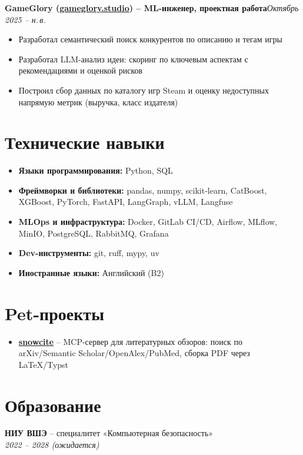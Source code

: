 \documentclass[a4paper,11pt]{article}
\begin{document}
\textbf{GameGlory (\href{https://gameglory.studio/}{gameglory.studio}) -- ML-инженер, проектная работа}\hfill \textit{Октябрь 2025 -- н.\,в.}

\begin{itemize}
  \item Разработал семантический поиск конкурентов по описанию и тегам игры
  \item Разработал LLM-анализ идеи: скоринг по ключевым аспектам с рекомендациями и оценкой рисков
  \item Построил сбор данных по каталогу игр Steam и оценку недоступных напрямую метрик (выручка, класс издателя)
\end{itemize}

\section*{Технические навыки}
\begin{itemize}
  \item \textbf{Языки программирования:} Python, SQL
  \item \textbf{Фреймворки и библиотеки:} pandas, numpy, scikit-learn, CatBoost, XGBoost, PyTorch, FastAPI, LangGraph, vLLM, Langfuse
  \item \textbf{MLOps и инфраструктура:} Docker, GitLab CI/CD, Airflow, MLflow, MinIO, PostgreSQL, RabbitMQ, Grafana
  \item \textbf{Dev-инструменты:} git, ruff, mypy, uv
  \item \textbf{Иностранные языки:} Английский (B2)
\end{itemize}

\section*{Pet-проекты}
\begin{itemize}
  \item \href{https://github.com/cop1cat/snowcite}{\textbf{snowcite}} -- MCP-сервер для литературных обзоров: поиск по arXiv/Semantic Scholar/OpenAlex/PubMed, сборка PDF через LaTeX/Typst
\end{itemize}

\section*{Образование}
\textbf{НИУ ВШЭ} -- специалитет «Компьютерная безопасность»\\
\textit{2022 -- 2028 (ожидается)}
\end{document}
